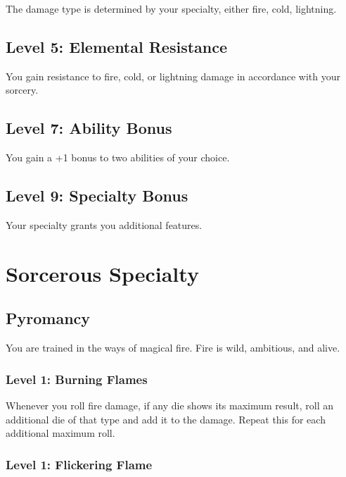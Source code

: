 \documentclass[12pt,letterpaper,twocolumn,openany,nodeprecatedcode,bg=none]{dndbook}
\let\oldsubsection\subsection
\renewcommand{\subsection}[1]{%
  \needspace{5\baselineskip}%
  \oldsubsection{#1}%
}
\begin{document}
The damage type is determined by your specialty, either fire, cold,
lightning.

\subsection{Level 5: Elemental
Resistance}\label{level-5-elemental-resistance}

You gain resistance to fire, cold, or lightning damage in accordance
with your sorcery.

\subsection{Level 7: Ability Bonus}\label{level-7-ability-bonus}

You gain a +1 bonus to two abilities of your choice.

\subsection{Level 9: Specialty Bonus}\label{level-9-specialty-bonus}

Your specialty grants you additional features.

\clearpage

\section{Sorcerous Specialty}\label{sorcerous-specialty}

\subsection{Pyromancy}\label{pyromancy}

You are trained in the ways of magical fire. Fire is wild, ambitious,
and alive.

\subsubsection{Level 1: Burning Flames}\label{level-1-burning-flames}

Whenever you roll fire damage, if any die shows its maximum result, roll
an additional die of that type and add it to the damage. Repeat this for
each additional maximum roll.

\subsubsection{Level 1: Flickering
Flame}\label{level-1-flickering-flame}
\end{document}
